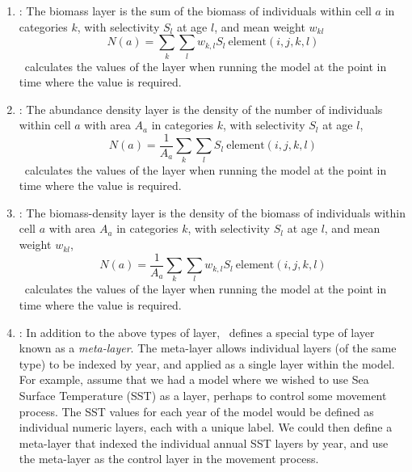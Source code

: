 \begin{enumerate}
\item {}: The biomass layer is the sum of the biomass of individuals within cell $a$ in categories $k$, with selectivity $S_l$ at age $l$, and mean weight $w_{kl}$
\begin{equation}
  N(a) = \sum\limits_{k} \sum\limits_l w_{k,l} S_l \ \text{element}(i,j,k,l) 
\end{equation}
\SPM\ calculates the values of the layer when running the model at the point in time where the value is required.

\item {}: The abundance density layer is the density of the number of individuals within cell $a$ with area $A_a$ in categories $k$, with selectivity $S_l$ at age $l$,
\begin{equation}
  N(a) = \frac{1}{A_a} \sum\limits_{k} \sum\limits_l S_l \ \text{element}(i,j,k,l)
\end{equation}
\SPM\ calculates the values of the layer when running the model at the point in time where the value is required.

\item {}: The biomass-density layer is the density of the biomass of individuals within cell $a$ with area $A_a$ in categories $k$, with selectivity $S_l$ at age $l$, and mean weight $w_{kl}$,
\begin{equation}
  N(a) = \frac{1}{A_a} \sum\limits_{k} \sum\limits_l w_{k,l} S_l \ \text{element}(i,j,k,l)
\end{equation}
\SPM\ calculates the values of the layer when running the model at the point in time where the value is required.

\item {\label{meta-layer}}: In addition to the above types of layer, \SPM\ defines a special type of layer known as a \emph{meta-layer}. The meta-layer allows individual layers (of the same type) to be indexed by year, and applied as a single layer within the model. For example, assume that we had a model where we wished to use Sea Surface Temperature (SST) as a layer, perhaps to control some movement process. The SST values for each year of the model would be defined as individual numeric layers, each with a unique label. We could then define a meta-layer that indexed the individual annual SST layers by year, and use the meta-layer as the control layer in the movement process. 
\end{enumerate}

